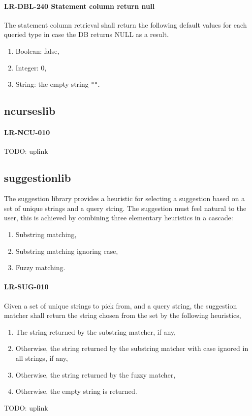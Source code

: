 \paragraph{LR-DBL-240 Statement column return null}
The statement column retrieval shall return the following
default values for each queried type in case the DB returns
NULL as a result.
\begin{enumerate}
\item Boolean: false,
\item Integer: 0,
\item String: the empty string \lstinline{""}.
\end{enumerate}

\subsection{ncurses\textunderscore lib}
\paragraph{LR-NCU-010}
TODO: uplink

\subsection{suggestion\textunderscore lib}
The suggestion library provides a heuristic for selecting a suggestion
based on a set of unique strings and a query string. The suggestion
must feel natural to the user, this is achieved by combining three
elementary heuristics in a cascade:
\begin{enumerate}
\item Substring matching,
\item Substring matching ignoring case,
\item Fuzzy matching.
\end{enumerate}

\paragraph{LR-SUG-010}
Given a set of unique strings to pick from, and a query string,
the suggestion matcher shall return the string chosen from the set
by the following heuristics,
\begin{enumerate}
\item The string returned by the substring matcher, if any,
\item Otherwise, the string returned by the substring matcher
      with case ignored in all strings, if any,
\item Otherwise, the string returned by the fuzzy matcher,
\item Otherwise, the empty string is returned.
\end{enumerate}
TODO: uplink

